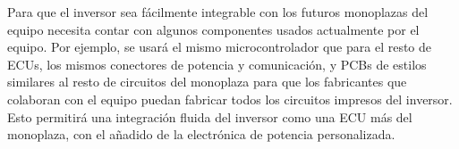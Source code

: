 Para que el inversor sea fácilmente integrable con los futuros monoplazas del equipo necesita contar con algunos componentes usados actualmente por el equipo. Por ejemplo, se usará el mismo microcontrolador que para el resto de ECUs, los mismos conectores de potencia y comunicación, y PCBs de estilos similares al resto de circuitos del monoplaza para que los fabricantes que colaboran con el equipo puedan fabricar todos los circuitos impresos del inversor. Esto permitirá una integración fluida del inversor como una ECU más del monoplaza, con el añadido de la electrónica de potencia personalizada.